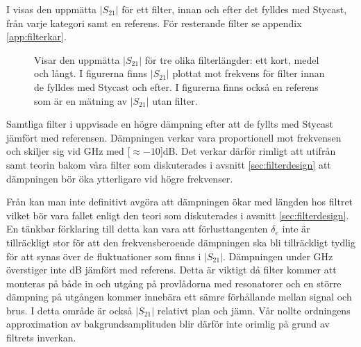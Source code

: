 \documentclass[main.tex]{subfiles}
\begin{document}
I  visas den uppmätta $|S_{21}|$ för ett filter, innan och efter det fylldes med Stycast, från varje kategori samt en referens. För resterande filter se appendix \ref{app:filterkar}.

\begin{figure}[H]
    \centerfloat
    \begin{subfigure}[t]{0.329\textwidth}
        \centerfloat
        \setlength{}
        \setlength\figureheight{11em}
        
    \end{subfigure}
    \begin{subfigure}[t]{0.329\textwidth}
        \centerfloat
        \setlength{}
        \setlength\figureheight{11em}
        
    \end{subfigure}
    \begin{subfigure}[t]{0.329\textwidth}
        \centering
        \setlength{}
        \setlength\figureheight{11em}
        
    \end{subfigure}
    \caption{Visar den uppmätta $|S_{21}|$ för tre olika filterlängder: ett kort, medel och långt. I figurerna finns $|S_{21}|$ plottat mot frekvens för filter innan de fylldes med Stycast och efter. I figurerna finns också en referens som är en mätning av $|S_{21}|$ utan filter.}
    \label{fig:filter_kar}
\end{figure}

Samtliga filter i  uppvisade en högre dämpning efter att de fyllts med Stycast jämfört med referensen. Dämpningen verkar vara proportionell mot frekvensen och skiljer sig vid \unit[50]{GHz} med \unit[$\approx-10$]{dB}. Det verkar därför rimligt att utifrån  samt teorin bakom våra filter som diskuterades i avsnitt \ref{sec:filterdesign} att dämpningen bör öka ytterligare vid högre frekvenser.


Från  kan man inte definitivt avgöra att dämpningen ökar med längden hos filtret vilket bör vara fallet enligt den teori som diskuterades i avsnitt \ref{sec:filterdesign}. En tänkbar förklaring till detta kan vara att förlusttangenten $\delta_e$ inte är tillräckligt stor för att den frekvensberoende dämpningen ska bli tillräckligt tydlig för att synas över de fluktuationer som finns i $|S_{21}|$.%
Dämpningen under \unit[10]{GHz} överstiger inte \unit[3]{dB} jämfört med referens. Detta är viktigt då filter kommer att monteras på både in och utgång på provlådorna med resonatorer och en större dämpning på utgången kommer innebära ett sämre förhållande mellan signal och brus. I detta område är också $|S_{21}|$ relativt plan och jämn. Vår nollte ordningens approximation av bakgrundsamplituden blir därför inte orimlig på grund av filtrets inverkan.
\end{document}
